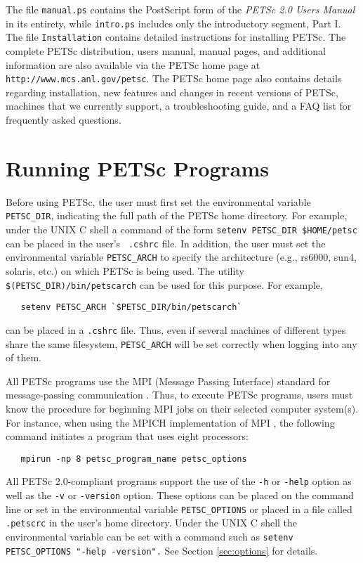 The file {\tt manual.ps} contains the PostScript form of
the {\em PETSc 2.0 Users Manual} in its entirety, while {\tt intro.ps} 
includes only the introductory segment, Part I.   
The file {\tt Installation} contains detailed instructions for
installing PETSc. The complete PETSc distribution, users
manual, manual pages, and additional information are also available via
the PETSc home page at
{\tt http://www.mcs.anl.gov/petsc}.  The PETSc home page also
contains details regarding installation, new features and changes in recent
versions of PETSc, machines that we currently support, a
troubleshooting guide, and a FAQ list for frequently asked questions.

\section{Running PETSc Programs}
\label{sec:running}

Before using PETSc, the user must first set the environmental variable
{\tt PETSC\_DIR},  indicating the full path of the PETSc home
directory.  For example, under the UNIX C shell a command of the form
{\tt setenv PETSC\_DIR \$HOME/petsc} can be placed in the user's {\tt
.cshrc} file.  In addition, the user must set the environmental
variable {\tt PETSC\_ARCH} to specify the architecture (e.g., rs6000,
sun4, solaris, etc.)  on which PETSc is being used.  The utility {\tt
\$(PETSC\_DIR)/bin/petscarch} can be used for this purpose.  For example,
\begin{verbatim}
   setenv PETSC_ARCH `$PETSC_DIR/bin/petscarch`
\end{verbatim}
can be placed in a {\tt .cshrc} file.  Thus, even if several machines of different
types share the same filesystem, {\tt PETSC\_ARCH} will be set correctly
when logging into any of them. 

All PETSc programs use the MPI (Message Passing Interface) standard
for message-passing communication \cite{MPI-final}.  Thus, to execute
PETSc programs, users must know the procedure for beginning MPI jobs
on their selected computer system(s).  For instance, when using the
MPICH implementation of MPI \cite{mpich-web-page}, the following
command initiates a program that uses eight processors:
  
\begin{verbatim}
   mpirun -np 8 petsc_program_name petsc_options
\end{verbatim}


All PETSc 2.0-compliant programs support the use of the {\tt -h}
 or {\tt -help} option as well as the {\tt -v} 
or {\tt -version} option. These options can be placed on the
  command line or set in the
environmental variable {\tt PETSC\_OPTIONS} or placed in a file called
{\tt .petscrc} in the user's home directory.  Under the UNIX C shell
the environmental variable can be set 
 with a command such as {\tt setenv PETSC\_OPTIONS
"-help -version".}  See Section \ref{sec:options} for details.


